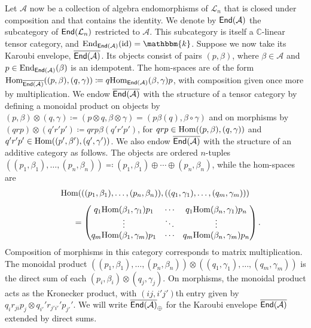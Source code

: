 \noindent Let $\mathcal{A}$ now be a collection of algebra endomorphisms of $\mathcal{L}_n$ that is closed under composition and that contains the identity. We denote by $\textup{\textsf{End}}(\mathcal{A})$ the subcategory of $\textup{\textsf{End}}(\mathcal{L}_n)$ restricted to $\mathcal{A}$. This subcategory is itself a $\mathbb{C}$-linear tensor category, and $\End_{\textcat{End}(\mathcal{A})}(\id) = \mathbbm{k}$. Suppose we now take its Karoubi envelope, $\overline{\textup{\textsf{End}}(\mathcal{A})}$. Its objects consist of pairs $(p, \beta)$, where $\beta \in \mathcal{A}$ and $p \in \textup{End}_{\textup{\textsf{End}}(\mathcal{A})}(\beta)$ is an idempotent. The hom-spaces are of the form $\textup{Hom}_{\overline{\textup{\textsf{End}}(\mathcal{A})}}((p, \beta), (q, \gamma)) \coloneqq q\textup{Hom}_{\textup{\textsf{End}}(\mathcal{A})}(\beta, \gamma)p$, with composition given once more by multiplication. We endow $\overline{\textup{\textsf{End}}(\mathcal{A})}$ with the structure of a tensor category by defining a monoidal product on objects by ${(p, \beta) \otimes (q, \gamma) \coloneqq (p \otimes q, \beta \otimes \gamma) = (p\beta(q), \beta\circ\gamma)}$ and on morphisms by $(qrp) \otimes (q'r'p') \coloneqq qrp\beta(q'r'p')$, for $qrp \in \textup{Hom}((p,\beta), (q,\gamma))$ and\linebreak $q'r'p' \in \textup{Hom}((p',\beta'), (q',\gamma'))$. We also endow $\overline{\textup{\textsf{End}}(\mathcal{A})}$ with the structure of an additive category as follows. The objects %
are ordered $n$-tuples ${((p_1, \beta_1), \dots, (p_n, \beta_n)) \eqcolon (p_1, \beta_1) \oplus \cdots \oplus (p_n, \beta_n)}$, while the hom-spaces are
\begin{align*}
\begin{split}
\textup{Hom}(((p_1, \beta_1), \dots, (p_n, \beta_n)), ((q_1, \gamma_1), \dots, (q_m, \gamma_m)))
\end{split}
\end{align*}
\begin{align*}
\begin{split}
\qquad\quad= \begin{pmatrix} q_1\textup{Hom}(\beta_1, \gamma_1)p_1 & \cdots & q_1\textup{Hom}(\beta_n, \gamma_1)p_n\\ \vdots & \ddots & \vdots\\ q_m\textup{Hom}(\beta_1, \gamma_m)p_1 & \cdots & q_m\textup{Hom}(\beta_n, \gamma_m)p_n\end{pmatrix}.
\end{split}
\end{align*}
\noindent Composition of morphisms in this category corresponds to matrix multiplication. The monoidal product $((p_1, \beta_1), \dots, (p_n, \beta_n)) \otimes ((q_1, \gamma_1), \dots, (q_m, \gamma_m))$ is the direct sum of each $(p_i, \beta_i) \otimes (q_j, \gamma_j)$. On morphisms, the monoidal product acts as the Kronecker product, with $(ij, i'j')$th entry given by $q_ir_{ji}p_j \otimes q_{i'}'r_{j'i'}'p_{j'}'$. We will write $\overline{\textup{\textsf{End}}(\mathcal{A})}_\oplus$ for the Karoubi envelope $\overline{\textup{\textsf{End}}(\mathcal{A})}$ extended by direct sums.\\

